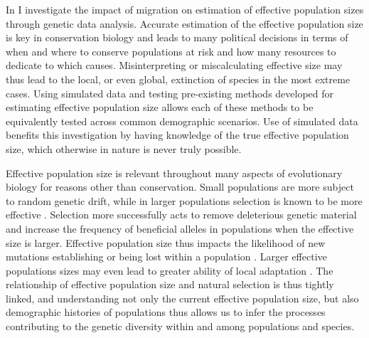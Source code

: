 In  I investigate the impact of migration on estimation of effective population sizes through genetic data analysis. Accurate estimation of the effective population size is key in conservation biology and leads to many political decisions in terms of when and where to conserve populations at risk and how many resources to dedicate to which causes. Misinterpreting or miscalculating effective size may thus lead to the local, or even global, extinction of species in the most extreme cases. Using simulated data and testing pre-existing methods developed for estimating effective population size allows each of these methods to be equivalently tested across common demographic scenarios. Use of simulated data benefits this investigation by having knowledge of the true effective population size, which otherwise in nature is never truly possible.



Effective population size is relevant throughout many aspects of evolutionary biology for reasons other than conservation. Small populations are more subject to random genetic drift, while in larger populations selection is known to be more effective \citep{Wright:1931, Kimura:1964, Gravel:2016}. Selection more successfully acts to remove deleterious genetic material and increase the frequency of beneficial alleles in populations when the effective size is larger. Effective population size thus impacts the likelihood of new mutations establishing or being lost within a population \citep{Kimura:1962, Whitlock:2000}. Larger effective populations sizes may even lead to greater ability of local adaptation \citep{Leimu:2008}. The relationship of effective population size and natural selection is thus tightly linked, and understanding not only the current effective population size, but also demographic histories of populations thus allows us to infer the processes contributing to the genetic diversity within and among populations and species.%

